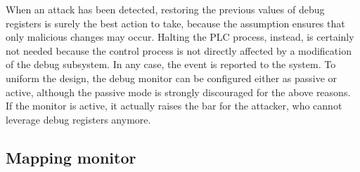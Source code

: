 When an attack has been detected, restoring the previous values of debug registers is surely the best action to take,
because the assumption ensures that only malicious changes may occur.
Halting the PLC process, instead, is certainly not needed because the control process is not directly affected by a modification of the debug subsystem.
In any case, the event is reported to the system. To uniform the design, the debug monitor can be configured either as passive or active,
although the passive mode is strongly discouraged for the above reasons. If the monitor is active, it actually raises the bar for the attacker,
who cannot leverage debug registers anymore.


\subsection{Mapping monitor}
\label{sec:map-design}

